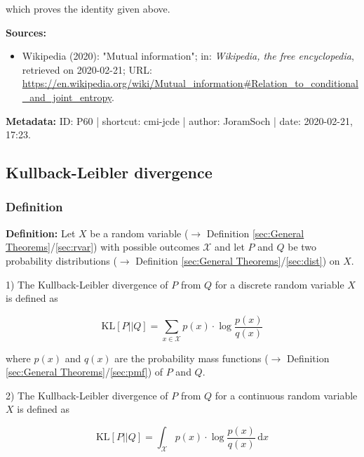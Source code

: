 \documentclass[a4paper,12pt,twoside]{book}
\begin{document}
which proves the identity given above.


\vspace{1em}
\textbf{Sources:}
\begin{itemize}
\item Wikipedia (2020): "Mutual information"; in: \textit{Wikipedia, the free encyclopedia}, retrieved on 2020-02-21; URL: \url{https://en.wikipedia.org/wiki/Mutual_information#Relation_to_conditional_and_joint_entropy}.
\end{itemize}


\vspace{1em}
\textbf{Metadata:} ID: P60 | shortcut: cmi-jcde | author: JoramSoch | date: 2020-02-21, 17:23.
\vspace{1em}



\subsection{Kullback-Leibler divergence}

\subsubsection[\textit{Definition}]{Definition} \label{sec:kl}
\setcounter{equation}{0}

\textbf{Definition:} Let $X$ be a random variable ($\rightarrow$ Definition \ref{sec:General Theorems}/\ref{sec:rvar}) with possible outcomes $\mathcal{X}$ and let $P$ and $Q$ be two probability distributions ($\rightarrow$ Definition \ref{sec:General Theorems}/\ref{sec:dist}) on $X$.

1) The Kullback-Leibler divergence of $P$ from $Q$ for a discrete random variable $X$ is defined as

\begin{equation} \label{eq:kl-KL-disc}
\mathrm{KL}[P||Q] = \sum_{x \in \mathcal{X}} p(x) \cdot \log \frac{p(x)}{q(x)}
\end{equation}

where $p(x)$ and $q(x)$ are the probability mass functions ($\rightarrow$ Definition \ref{sec:General Theorems}/\ref{sec:pmf}) of $P$ and $Q$.

2) The Kullback-Leibler divergence of $P$ from $Q$ for a continuous random variable $X$ is defined as

\begin{equation} \label{eq:kl-KL-cont}
\mathrm{KL}[P||Q] = \int_{\mathcal{X}} p(x) \cdot \log \frac{p(x)}{q(x)} \, \mathrm{d}x
\end{equation}
\end{document}
